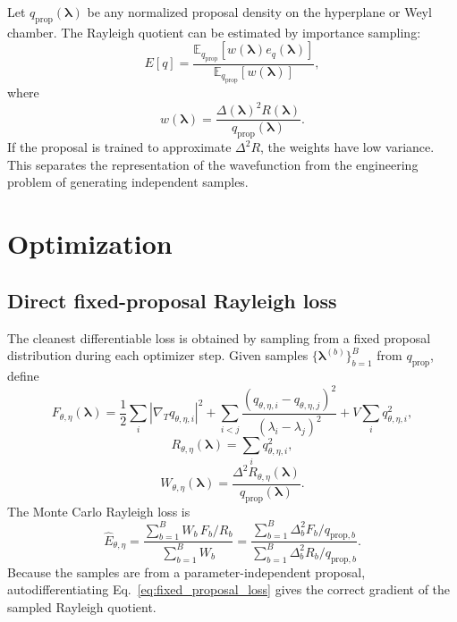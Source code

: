 \documentclass[11pt]{article}
\newcommand{\E}{\mathbb E}
\newcommand{\gradT}{\nabla_{\!T}}
\begin{document}
Let $q_{\mathrm{prop}}(\bm\lambda)$ be any normalized proposal density on the hyperplane or Weyl chamber.  The Rayleigh quotient can be estimated by importance sampling:
\begin{equation}
E[q]
=\frac{
\E_{q_{\mathrm{prop}}}\left[w(\bm\lambda) e_q(\bm\lambda)\right]
}{
\E_{q_{\mathrm{prop}}}\left[w(\bm\lambda)\right]
},
\end{equation}
where
\begin{equation}
\boxed{
 w(\bm\lambda)=
\frac{\Delta(\bm\lambda)^2R(\bm\lambda)}{q_{\mathrm{prop}}(\bm\lambda)}.
}
\label{eq:importance_weight}
\end{equation}
If the proposal is trained to approximate $\Delta^2R$, the weights have low variance.  This separates the representation of the wavefunction from the engineering problem of generating independent samples.

\section{Optimization}

\subsection{Direct fixed-proposal Rayleigh loss}

The cleanest differentiable loss is obtained by sampling from a fixed proposal distribution during each optimizer step.  Given samples $\{\bm\lambda^{(b)}\}_{b=1}^B$ from $q_{\mathrm{prop}}$, define
\begin{equation}
F_{\theta,\eta}(\bm\lambda)
=\frac12\sum_i|\gradT q_{\theta,\eta,i}|^2
+\sum_{i<j}\frac{(q_{\theta,\eta,i}-q_{\theta,\eta,j})^2}{(\lambda_i-\lambda_j)^2}
+V\sum_iq_{\theta,\eta,i}^2,
\end{equation}
\begin{equation}
R_{\theta,\eta}(\bm\lambda)=\sum_iq_{\theta,\eta,i}^2,
\end{equation}
\begin{equation}
W_{\theta,\eta}(\bm\lambda)=\frac{\Delta^2R_{\theta,\eta}(\bm\lambda)}{q_{\mathrm{prop}}(\bm\lambda)}.
\end{equation}
The Monte Carlo Rayleigh loss is
\begin{equation}
\boxed{
\widehat E_{\theta,\eta}
=\frac{\sum_{b=1}^B W_b\,F_b/R_b}{\sum_{b=1}^B W_b}
=\frac{\sum_{b=1}^B \Delta_b^2F_b/q_{\mathrm{prop},b}}{\sum_{b=1}^B \Delta_b^2R_b/q_{\mathrm{prop},b}}.
}
\label{eq:fixed_proposal_loss}
\end{equation}
Because the samples are from a parameter-independent proposal, autodifferentiating Eq.~\eqref{eq:fixed_proposal_loss} gives the correct gradient of the sampled Rayleigh quotient.
\end{document}
